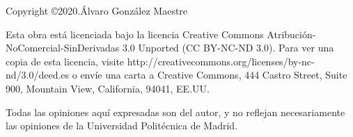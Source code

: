 \begin{flushleft}

Copyright \copyright  2020.Álvaro González Maestre


Esta obra está licenciada bajo la licencia Creative Commons Atribución-NoComercial-SinDerivadas 3.0 Unported (CC BY-NC-ND 3.0). Para ver una copia de esta licencia, visite http://creativecommons.org/licenses/by-nc-nd/3.0/deed.es o envíe una carta a Creative Commons, 444 Castro Street, Suite 900, Mountain View, California, 94041, EE.UU.

Todas las opiniones aquí expresadas son del autor, y no reflejan necesariamente las opiniones
de la Universidad Politécnica de Madrid.

\end{flushleft}